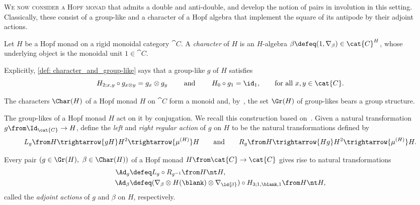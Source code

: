 \textsc{We now consider a Hopf monad}
that admits a double and anti\hyp{}double,
and develop the notion of pairs in involution in this setting.
Classically, these consist of a group-like and a character of a Hopf algebra
that implement the square of its antipode by their adjoint actions.

\begin{definition}\label{def: character_and_group-like}
  Let \(H\) be a Hopf monad on a rigid monoidal category \(\cat{C}\).
  A \emph{character} of \(H\) is an \(H\)-algebra \(\beta \defeq (1, \nabla_{\beta}) \in \cat{C}^H\),
  whose underlying object is the monoidal unit \(1 \in \cat{C}\).
\end{definition}

\begin{remark}
  Explicitly, \cref{def: character_and_group-like} says that
  a group-like \(g\) of \(H\) satisfies
  \[
    H_{2;x,y} \circ g_{x\otimes y} = g_x \otimes g_y
    \qquad \text{ and } \qquad
    H_0 \circ g_1= \id_1,\qquad
    \text{for all \(x, y \in \cat{C}\)}.
  \]
\end{remark}

The characters \(\Char(H)\) of a Hopf monad \(H\) on \(\cat{C}\) form a monoid
and, by~\cite[Lemma~3.21]{Bruguieres2007}, the set \(\Gr(H)\) of group-likes bears a group structure.

\begin{example}
  The group-likes of a Hopf monad \(H\) act on it by conjugation.
  We recall this construction based on~\cite[Section~1.4]{Bruguieres2007}.
  Given a natural transformation \(g \from \Id_{\cat{C}} \to H\),
  define the \emph{left} and \emph{right regular action} of \(g\) on \(H\) to be the natural transformations defined by
  \[
    L_{g}\from H \trightarrow{gH} H^2 \trightarrow{\mu^{(H)}} H
    \qquad\text{and}\qquad
    R_{g}\from H \trightarrow{Hg} H^2 \trightarrow{\mu^{(H)}} H.
  \]
\end{example}

\begin{definition}\label{def: adjoint_action}
  Every pair \((g \in \Gr(H),\ \beta \in \Char(H))\)
  of a Hopf monad \(H \from \cat{C} \to \cat{C}\)
  gives rise to natural transformations%
  \begin{align*}
    \Ad_{g} &\defeq L_{g} \circ R_{g^{-1}} \from H \nt H, \\
    \Ad_{\beta} &\defeq (\nabla_{\beta} \otimes H(\blank) \otimes \nabla_{\ld{\!\beta}}) \circ H_{3; 1, \blank ,1} \from H \nt H,
  \end{align*}
  called the \emph{adjoint actions} of \(g\) and \(\beta\) on \(H\), respectively.
\end{definition}

